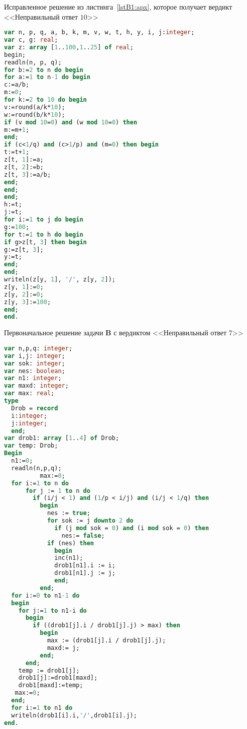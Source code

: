 \begin{algorithm}[!h] 
\caption{Исправленное решение из листинга~\ref{lstB1:apx}, которое получает вердикт <<Неправильный ответ $10$>>}\label{lstB2:apx} 
\begin{lstlisting}[language=pascal, basicstyle=\small]
var n, p, q, a, b, k, m, v, w, t, h, y, i, j:integer;
var c, g: real;
var z: array [1..100,1..25] of real;
begin;
readln(n, p, q);
for b:=2 to n do begin
for a:=1 to n-1 do begin
c:=a/b;
m:=0;
for k:=2 to 10 do begin
v:=round(a/k*10);
w:=round(b/k*10);
if (v mod 10=0) and (w mod 10=0) then
m:=m+1;
end;
if (c<1/q) and (c>1/p) and (m=0) then begin
t:=t+1;
z[t, 1]:=a;
z[t, 2]:=b;
z[t, 3]:=a/b;
end;
end;
end;
h:=t;
j:=t;
for i:=1 to j do begin
g:=100;
for t:=1 to h do begin
if g>z[t, 3] then begin
g:=z[t, 3];
y:=t;
end;
end;
writeln(z[y, 1], '/', z[y, 2]);
z[y, 1]:=0;
z[y, 2]:=0;
z[y, 3]:=100;
end;
end.
\end{lstlisting} 
\end{algorithm}

\begin{algorithm}[!h] 
\caption{Первоначальное решение задачи \textbf{B} с вердиктом <<Неправильный ответ $7$>>}\label{lstB3:apx} 
\begin{lstlisting}[language=pascal, basicstyle=\small]
var n,p,q: integer;
var i,j: integer;  
var sok: integer;  
var nes: boolean;  
var n1: integer;   
var maxd: integer; 
var max: real;
type
  Drob = record
  i:integer; 
  j:integer; 
  end;
var drob1: array [1..4] of Drob;
var temp: Drob;
Begin
  n1:=0;
  readln(n,p,q);
          max:=0;
  for i:=1 to n do
      for j := 1 to n do
        if (i/j < 1) and (1/p < i/j) and (i/j < 1/q) then
          begin
            nes := true;
            for sok := j downto 2 do
              if (j mod sok = 0) and (i mod sok = 0) then
                nes:= false;
            if (nes) then
              begin
              inc(n1);
              drob1[n1].i := i;
              drob1[n1].j := j;
              end;
          end;
  for i:=0 to n1-1 do
  begin
    for j:=1 to n1-i do
      begin
        if ((drob1[j].i / drob1[j].j) > max) then
          begin
            max := (drob1[j].i / drob1[j].j);
            maxd:= j;
          end;
      end;
    temp := drob1[j];
    drob1[j]:=drob1[maxd];
    drob1[maxd]:=temp;
   max:=0;
  end;
  for i:=1 to n1 do
  writeln(drob1[i].i,'/',drob1[i].j);
end.
\end{lstlisting} 
\end{algorithm}


